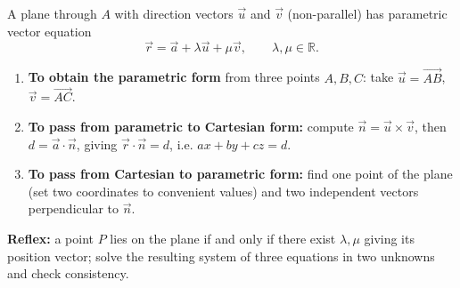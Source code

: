 \documentclass[11pt]{article}
\newcommand{\cle}[1]{{\popxbold\color{popdark}#1}}
\begin{document}
\begin{methode}
A plane through $A$ with direction vectors $\vec{u}$ and $\vec{v}$ (non-parallel) has \cle{parametric vector equation}
\[ \vec{r} = \vec{a} + \lambda \vec{u} + \mu \vec{v}, \qquad \lambda, \mu \in \mathbb{R}. \]
\begin{enumerate}
\item \textbf{To obtain the parametric form} from three points $A, B, C$: take $\vec{u} = \vec{AB}$, $\vec{v} = \vec{AC}$.
\item \textbf{To pass from parametric to Cartesian form:} compute $\vec{n} = \vec{u} \times \vec{v}$, then $d = \vec{a}\cdot\vec{n}$, giving $\vec{r}\cdot\vec{n} = d$, i.e. $ax+by+cz=d$.
\item \textbf{To pass from Cartesian to parametric form:} find one point of the plane (set two coordinates to convenient values) and two independent vectors perpendicular to $\vec{n}$.
\end{enumerate}
\textbf{Reflex:} a point $P$ lies on the plane if and only if there exist $\lambda, \mu$ giving its position vector; solve the resulting system of three equations in two unknowns and check consistency.
\end{methode}
\end{document}
